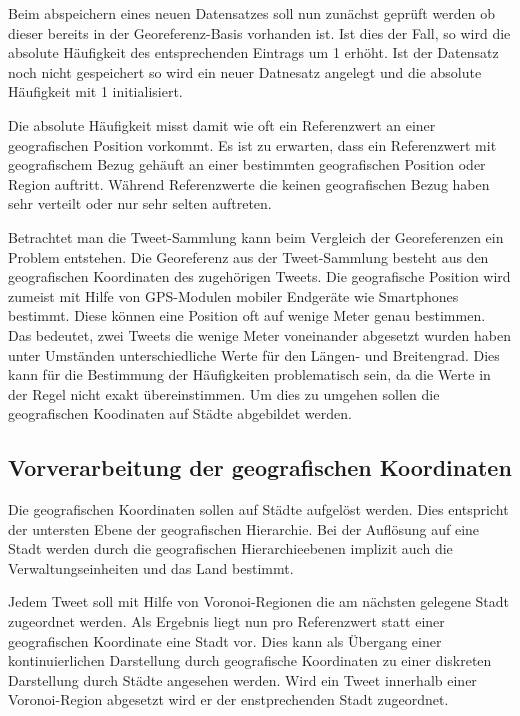 			Beim abspeichern eines neuen Datensatzes soll nun zunächst geprüft werden ob dieser bereits in der Georeferenz-Basis vorhanden ist. 
			Ist dies der Fall, so wird die absolute Häufigkeit des entsprechenden Eintrags um 1 erhöht.
			Ist der Datensatz noch nicht gespeichert so wird ein neuer Datnesatz angelegt und die absolute Häufigkeit mit 1 initialisiert.

			Die absolute Häufigkeit misst damit wie oft ein Referenzwert an einer geografischen Position vorkommt.
			Es ist zu erwarten, dass ein Referenzwert mit geografischem Bezug gehäuft an einer bestimmten geografischen Position oder Region auftritt.
			Während Referenzwerte die keinen geografischen Bezug haben sehr verteilt oder nur sehr selten auftreten. 

			Betrachtet man die Tweet-Sammlung kann beim Vergleich der Georeferenzen ein Problem entstehen.
			Die Georeferenz aus der Tweet-Sammlung besteht aus den geografischen Koordinaten des zugehörigen Tweets.
			Die geografische Position wird zumeist mit Hilfe von GPS-Modulen mobiler Endgeräte wie Smartphones bestimmt. 
			Diese können eine Position oft auf wenige Meter genau bestimmen.
			Das bedeutet, zwei Tweets die wenige Meter voneinander abgesetzt wurden haben unter Umständen unterschiedliche Werte für den Längen- und Breitengrad.
			Dies kann für die Bestimmung der Häufigkeiten problematisch sein, da die Werte in der Regel nicht exakt übereinstimmen.
			Um dies zu umgehen sollen die geografischen Koodinaten auf Städte abgebildet werden.

		\subsection{Vorverarbeitung der geografischen Koordinaten}

			Die geografischen Koordinaten sollen auf Städte aufgelöst werden.
			Dies entspricht der untersten Ebene der geografischen Hierarchie.
			Bei der Auflösung auf eine Stadt werden durch die geografischen Hierarchieebenen implizit auch die Verwaltungseinheiten und das Land bestimmt.

			Jedem Tweet soll mit Hilfe von Voronoi-Regionen die am nächsten gelegene Stadt zugeordnet werden.
			Als Ergebnis liegt nun pro Referenzwert statt einer geografischen Koordinate eine Stadt vor.
			Dies kann als Übergang einer kontinuierlichen Darstellung durch geografische Koordinaten zu einer diskreten Darstellung durch Städte angesehen werden. 
			Wird ein Tweet innerhalb einer Voronoi-Region abgesetzt wird er der enstprechenden Stadt zugeordnet.

